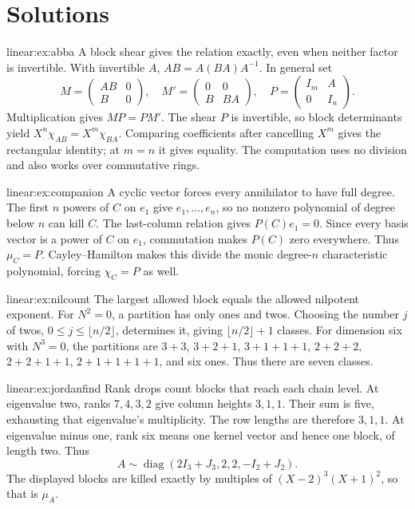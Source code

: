 \section{Solutions}
\begin{solution}{linear:ex:abba}
\idea A block shear gives the relation exactly, even when neither factor is invertible.
\writeup With invertible $A$, $AB=A(BA)A^{-1}$. In general set
\[M=\begin{pmatrix}AB&0\\B&0\end{pmatrix},\quad
M'=\begin{pmatrix}0&0\\B&BA\end{pmatrix},\quad P=\begin{pmatrix}I_m&A\\0&I_n\end{pmatrix}.
\]
Multiplication gives $MP=PM'$. The shear $P$ is invertible, so block determinants yield $X^n\chi_{AB}=X^m\chi_{BA}$. Comparing coefficients after cancelling $X^m$ gives the rectangular identity; at $m=n$ it gives equality. The computation uses no division and also works over commutative rings.
\end{solution}
\begin{solution}{linear:ex:companion}
\idea A cyclic vector forces every annihilator to have full degree.
\writeup The first $n$ powers of $C$ on $e_1$ give $e_1,\ldots,e_n$, so no nonzero polynomial of degree below $n$ can kill $C$. The last-column relation gives $P(C)e_1=0$. Since every basis vector is a power of $C$ on $e_1$, commutation makes $P(C)$ zero everywhere. Thus $\mu_C=P$. Cayley--Hamilton makes this divide the monic degree-$n$ characteristic polynomial, forcing $\chi_C=P$ as well.
\end{solution}
\begin{solution}{linear:ex:nilcount}
\idea The largest allowed block equals the allowed nilpotent exponent.
\writeup For $N^2=0$, a partition has only ones and twos. Choosing the number $j$ of twos, $0\le j\le\lfloor n/2\rfloor$, determines it, giving $\lfloor n/2\rfloor+1$ classes. For dimension six with $N^3=0$, the partitions are $3+3$, $3+2+1$, $3+1+1+1$, $2+2+2$, $2+2+1+1$, $2+1+1+1+1$, and six ones. Thus there are seven classes.
\end{solution}
\begin{solution}{linear:ex:jordanfind}
\idea Rank drops count blocks that reach each chain level.
\writeup At eigenvalue two, ranks $7,4,3,2$ give column heights $3,1,1$. Their sum is five, exhausting that eigenvalue's multiplicity. The row lengths are therefore $3,1,1$. At eigenvalue minus one, rank six means one kernel vector and hence one block, of length two. Thus
\[A\sim\operatorname{diag}(2I_3+J_3,2,2,-I_2+J_2).
\]
The displayed blocks are killed exactly by multiples of $(X-2)^3(X+1)^2$, so that is $\mu_A$.
\end{solution}
